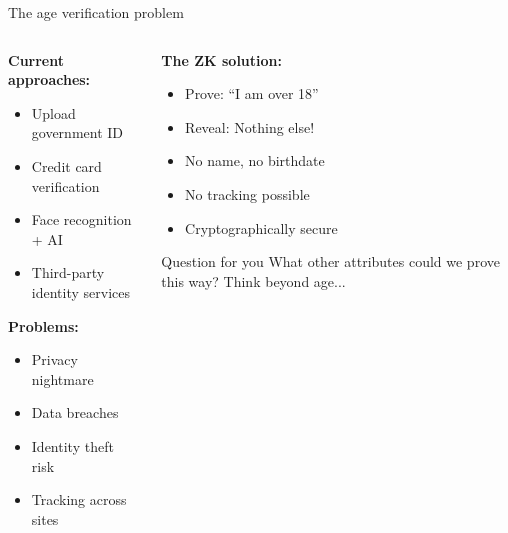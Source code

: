 \documentclass[aspectratio=169, lualatex, handout]{beamer}
\begin{document}
\begin{frame}{The age verification problem}
	\begin{columns}[c]
		\begin{column}{0.5\textwidth}
			\textbf{Current approaches:}
			\begin{itemize}
				\item Upload government ID
				\item Credit card verification
				\item Face recognition + AI
				\item Third-party identity services
			\end{itemize}
			\vspace{0.5em}
			\textbf{Problems:}
			\begin{itemize}
				\item Privacy nightmare
				\item Data breaches
				\item Identity theft risk
				\item Tracking across sites
			\end{itemize}
		\end{column}
		\begin{column}{0.5\textwidth}
			\textbf{The ZK solution:}
			\begin{itemize}
				\item Prove: ``I am over 18''
				\item Reveal: Nothing else!
				\item No name, no birthdate
				\item No tracking possible
				\item Cryptographically secure
			\end{itemize}
			\vspace{0.5em}
			\begin{block}{Question for you}
				What other attributes could we prove this way? Think beyond age...
			\end{block}
		\end{column}
	\end{columns}
\end{frame}
\end{document}
